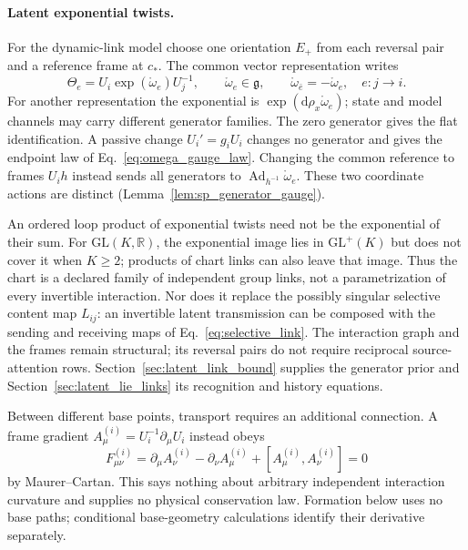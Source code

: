 \paragraph{Latent exponential twists.}
For the dynamic-link model choose one orientation $E_+$ from each reversal pair and a reference frame at $c_*$. The common vector representation writes
\begin{equation}
\boxed{\Theta_e=U_i\exp(\mathring\omega_e)U_j^{-1},\qquad
\mathring\omega_e\in\mathfrak g,\qquad
\mathring\omega_{\bar e}=-\mathring\omega_e,\quad e:j\to i.}
\label{eq:pifb_latent_link_chart}
\end{equation}
For another representation the exponential is $\exp(\mathrm d\rho_x\mathring\omega_e)$; state and model channels may carry different generator families. The zero generator gives the flat identification. A passive change $U_i'=g_iU_i$ changes no generator and gives the endpoint law of Eq.~\eqref{eq:omega_gauge_law}. Changing the common reference to frames $U_ih$ instead sends all generators to $\operatorname{Ad}_{h^{-1}}\mathring\omega_e$. These two coordinate actions are distinct (Lemma~\ref{lem:sp_generator_gauge}).

An ordered loop product of exponential twists need not be the exponential of their sum. For $\mathrm{GL}(K,\mathbb R)$, the exponential image lies in $\mathrm{GL}^+(K)$ but does not cover it when $K\geq2$; products of chart links can also leave that image. Thus the chart is a declared family of independent group links, not a parametrization of every invertible interaction. Nor does it replace the possibly singular selective content map $L_{ij}$: an invertible latent transmission can be composed with the sending and receiving maps of Eq.~\eqref{eq:selective_link}. The interaction graph and the frames remain structural; its reversal pairs do not require reciprocal source-attention rows. Section~\ref{sec:latent_link_bound} supplies the generator prior and Section~\ref{sec:latent_lie_links} its recognition and history equations.

\label{sec:connection_forms}\label{sec:field_strength}\label{sec:boundary_of_boundary}
Between different base points, transport requires an additional connection. A frame gradient $A_\mu^{(i)}=U_i^{-1}\partial_\mu U_i$ instead obeys
\begin{equation}
F_{\mu\nu}^{(i)}=\partial_\mu A_\nu^{(i)}-\partial_\nu A_\mu^{(i)}
+[A_\mu^{(i)},A_\nu^{(i)}]=0
\label{eq:connection_form}
\end{equation}
by Maurer--Cartan. This says nothing about arbitrary independent interaction curvature and supplies no physical conservation law. Formation below uses no base paths; conditional base-geometry calculations identify their derivative separately.

